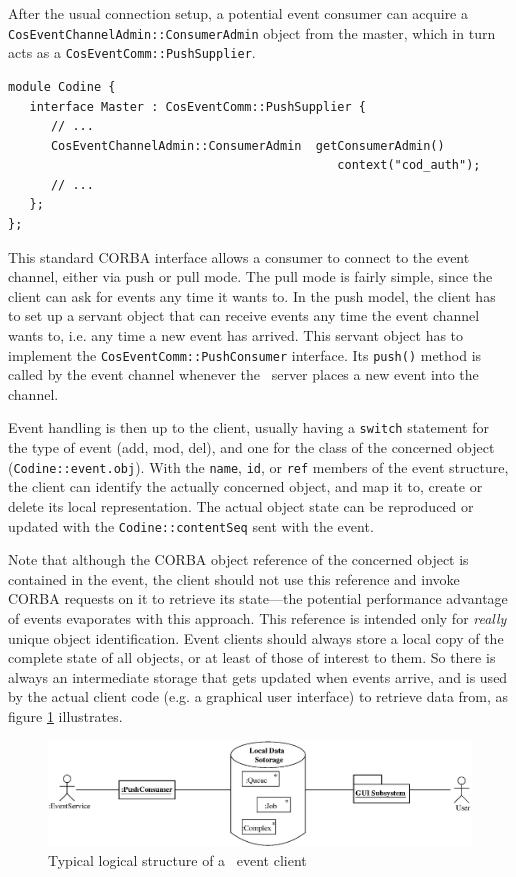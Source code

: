 After the usual connection setup, a potential event consumer can acquire a
\texttt{CosEventChannelAdmin::ConsumerAdmin} object from the master, which in
turn acts as a \texttt{CosEventComm::PushSupplier}.
\begin{Verbatim}[fontsize=\small, frame=single]
module Codine {
   interface Master : CosEventComm::PushSupplier {
      // ...
      CosEventChannelAdmin::ConsumerAdmin  getConsumerAdmin()
                                              context("cod_auth");
      // ...
   };
};
\end{Verbatim}
This standard CORBA interface
allows a consumer to connect to the event channel, either via push or pull
mode. The pull mode is fairly simple, since the client can ask for events any
time it wants to. In the push model, the client has to set up a servant
object that can receive events any time the event channel wants to, i.e. any
time a new event has arrived. This servant object has to implement the
\texttt{CosEventComm::PushConsumer} interface. Its \texttt{push()} method is
called by the event channel whenever the \qidl\ server places a new event
into the channel.

Event handling is then up to the client, usually having a \texttt{switch}
statement for the type of event (add, mod, del), and one for the class of the
concerned object (\texttt{Codine::event.obj}). With the \texttt{name},
\texttt{id}, or \texttt{ref} members of the event structure, the client can
identify the actually concerned object, and map it to, create or
delete its local representation. The actual object state can be reproduced 
or updated with the \texttt{Codine::contentSeq} sent with the event.

Note that although the CORBA object reference of the concerned object is
contained in the event, the client should not use this reference and invoke
CORBA requests on it to retrieve its state---the potential performance
advantage of events evaporates with this approach. This reference is intended
only for \emph{really} unique object identification. Event clients should
always store a local copy of the complete state of all objects, or at least
of those of interest to them. So there is always an intermediate storage that
gets updated when events arrive, and is used by the actual client code (e.g.
a graphical user interface) to retrieve data from, as figure
\ref{f_user_ev_client} illustrates.

\begin{figure}
\includegraphics[width=\textwidth]{evclient.eps}
\caption{\label{f_user_ev_client}Typical logical structure of a \qidl\ event
client}
\end{figure}

